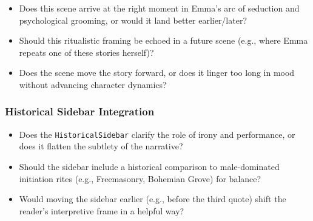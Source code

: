 \begin{itemize}
  \item Does this scene arrive at the right moment in Emma’s arc of seduction and psychological grooming, or would it land better earlier/later?
  \item Should this ritualistic framing be echoed in a future scene (e.g., where Emma repeats one of these stories herself)?
  \item Does the scene move the story forward, or does it linger too long in mood without advancing character dynamics?
\end{itemize}

\subsubsection*{Historical Sidebar Integration}

\begin{itemize}
  \item Does the \texttt{HistoricalSidebar} clarify the role of irony and performance, or does it flatten the subtlety of the narrative?
  \item Should the sidebar include a historical comparison to male-dominated initiation rites (e.g., Freemasonry, Bohemian Grove) for balance?
  \item Would moving the sidebar earlier (e.g., before the third quote) shift the reader’s interpretive frame in a helpful way?
\end{itemize}
